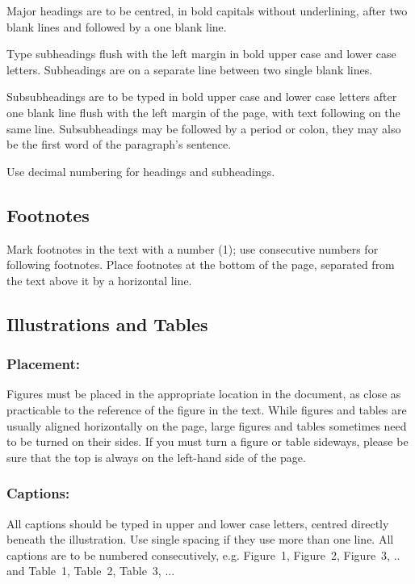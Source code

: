 \documentclass{isprs} %
\begin{document}
Major headings are to be centred, in bold capitals without 
underlining, after two blank lines and followed by a one blank line.

Type subheadings flush with the left margin in bold upper case and lower 
case letters. Subheadings are on a separate line between two single blank lines.

Subsubheadings are to be typed in bold upper case and lower case letters 
after one blank line flush with the left margin of the page, with text 
following on the same line. Subsubheadings may be followed by a period 
or colon, they may also be the first word of the paragraph's sentence.

Use decimal numbering for headings and subheadings.


\subsection{Footnotes}\label{sec:Footnotes}

Mark footnotes in the text with a number (1); use consecutive numbers for following footnotes. Place footnotes at the bottom of the page, separated from the text above it by a horizontal line.


\subsection{Illustrations and Tables}\label{sec:Illustrations and Tables}

\subsubsection{Placement:}\label{sec:Placement}

Figures must be placed in the appropriate location in the document, 
as close as practicable to the reference of the figure in the text. 
While figures and tables are usually aligned horizontally on the page, 
large figures and tables sometimes need to be turned on their sides. 
If you must turn a figure or table sideways, please be sure that the 
top is always on the left-hand side of the page.


\subsubsection{Captions:}\label{sec:Captions}

All captions should be typed in upper and lower case letters, 
centred directly beneath the illustration. Use single spacing if they 
use more than one line. All captions are to be numbered consecutively, 
e.g. Figure~1, Figure~2, Figure~3, ..  and Table~1, Table~2, Table~3, ...
\end{document}
